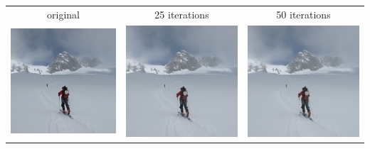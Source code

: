\documentclass{article}
\begin{document}
\begin{center}
    \begin{tabular}{c c c}
        original & 25 iterations & 50 iterations \\
        \includegraphics[width=0.3\linewidth]{../test_images/skiers.jpg} & \includegraphics[width=0.3\linewidth]{../test_images/dispersion_reduced/skiers25.png} & \includegraphics[width=0.3\linewidth]{../test_images/dispersion_reduced/skiers50.png} \\


\end{tabular}
\end{center}
\end{document}
